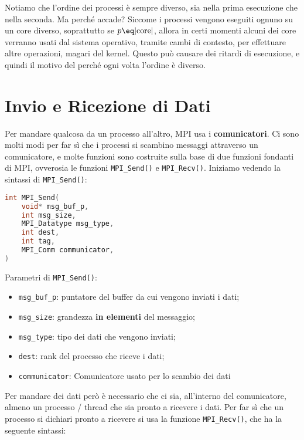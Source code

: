 Notiamo che l'ordine dei processi è sempre diverso, sia nella prima esecuzione che nella seconda. Ma perché accade? Siccome i processi vengono eseguiti ognuno su un core diverso, soprattutto se $p \eq |\text{core}|$, allora in certi momenti alcuni dei core verranno usati dal sistema operativo, tramite cambi di contesto, per effettuare altre operazioni, magari del kernel. Questo può causare dei ritardi di esecuzione, e quindi il motivo del perché ogni volta l'ordine è diverso.

\section{Invio e Ricezione di Dati}

Per mandare qualcosa da un processo all'altro, MPI usa i \textbf{comunicatori}. Ci sono molti modi per far sì che i processi si scambino messaggi attraverso un comunicatore, e molte funzioni sono costruite sulla base di due funzioni fondanti di MPI, ovverosia le funzioni \verb|MPI_Send()| e \verb|MPI_Recv()|. Iniziamo vedendo la sintassi di \verb|MPI_Send()|:

\begin{codedefine}
    \begin{lstlisting}[language = C, numbers = none]
int MPI_Send(
    void* msg_buf_p,
    int msg_size,
    MPI_Datatype msg_type,
    int dest,
    int tag,
    MPI_Comm communicator,
)\end{lstlisting}
    \manlower    
    Parametri di \verb|MPI_Send()|:
    \begin{itemize}
        \item \verb|msg_buf_p|: puntatore del buffer da cui vengono inviati i dati;
        \item \verb|msg_size|: grandezza \textbf{in elementi} del messaggio;
        \item \verb|msg_type|: tipo dei dati che vengono inviati;
        \item \verb|dest|: rank del processo che riceve i dati;
        \item \verb|communicator|: Comunicatore usato per lo scambio dei dati
    \end{itemize}
\end{codedefine}

Per mandare dei dati però è necessario che ci sia, all'interno del comunicatore, almeno un processo / thread che sia pronto a ricevere i dati. Per far sì che un processo si dichiari pronto a ricevere si usa la funzione \verb|MPI_Recv()|, che ha la seguente sintassi:

